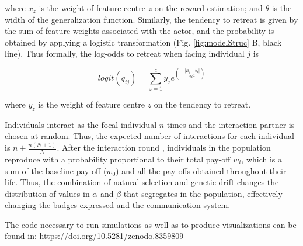 \documentclass[
  12pt,
]{article}
\begin{document}
where \(x_z\) is the weight of feature centre \(z\) on the reward
estimation; and \(\theta\) is the width of the generalization function.
Similarly, the tendency to retreat is given by the sum of feature
weights associated with the actor, and the probability is obtained by
applying a logistic transformation (Fig. \ref{fig:modelStruc} B, black
line). Thus formally, the log-odds to retreat when facing individual
\(j\) is

\begin{equation}
logit(q_{ij}) =  \sum_{z=1}^{c} y_z e^{(-\frac{|B_i-b_z|}{2\theta^2})} 
\end{equation}

where \(y_z\) is the weight of feature centre \(z\) on the tendency to
retreat.

Individuals interact as the focal individual \(n\) times and the
interaction partner is chosen at random. Thus, the expected number of
interactions for each individual is \(n+\frac{n(N+1)}{N}\). After the
interaction round , individuals in the population reproduce with a
probability proportional to their total pay-off \(w_i\), which is a sum
of the baseline pay-off (\(w_0\)) and all the pay-offs obtained
throughout their life. Thus, the combination of natural selection and
genetic drift changes the distribution of values in \(\alpha\) and
\(\beta\) that segregates in the population, effectively changing the
badges expressed and the communication system.

The code necessary to run simulations as well as to produce
visualizations can be found in:
\url{https://doi.org/10.5281/zenodo.8359809}
\end{document}
